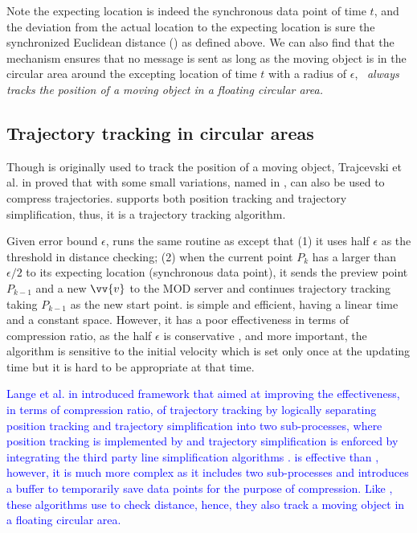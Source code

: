 Note the expecting location is indeed the synchronous data point \wrt of time $t$, and the deviation from the actual location to the expecting location is sure the synchronized Euclidean distance (\sed) as defined above. We can also find that the \ldr mechanism ensures that no message is sent as long as the moving object is in the circular area around the excepting location of time $t$ with a radius of $\epsilon$, \ie~\emph{\ldr always tracks the position of a moving object in a floating circular area.}


\subsection{Trajectory tracking in circular areas}
Though \ldr is originally used to track the position of a moving object, Trajcevski et al. in \cite{Trajcevski:LDRH} proved that \ldr with some small variations, named \ldrh in \cite{Lange:Tracking}, can also be used to compress trajectories. 
\ldrh supports both position tracking and trajectory simplification, thus, it is a trajectory tracking algorithm.

Given error bound $\epsilon$, \ldrh runs the same routine as \ldr except that (1) it uses half $\epsilon$ as the threshold in distance checking; (2) when the current point $P_k$ has a \sed larger than $\epsilon/2$ to its expecting location (synchronous data point), it sends the preview point $P_{k-1}$ and a new $\vv{v}$ to the MOD server and continues trajectory tracking taking $P_{k-1}$ as the new start point. \ldrh is simple and efficient, having a linear time and a constant space. However, it has a poor effectiveness in terms of compression ratio, as the half $\epsilon$ is conservative \cite{Lange:Tracking}, and more important, the algorithm is sensitive to the initial velocity which is set only once at the updating time but it is hard to be appropriate at that time.
 
\textcolor{blue}{ 
Lange et al. in \cite{Lange:GRTS, Lange:Tracking} introduced \grts framework that aimed at improving the effectiveness, in terms of compression ratio, of trajectory tracking by logically separating position tracking and trajectory simplification into two sub-processes, where position tracking is implemented by \ldr and trajectory simplification is enforced by integrating the third party line simplification algorithms \cite{Zhang:Evaluation, Lin:Cised}. \grts is effective than \ldrh, however, it is much more complex as it includes two sub-processes and introduces a buffer to temporarily save data points for the purpose of compression.
Like \ldr, these algorithms use \sed to check distance, hence, they also track a moving object in a floating circular area.
}


